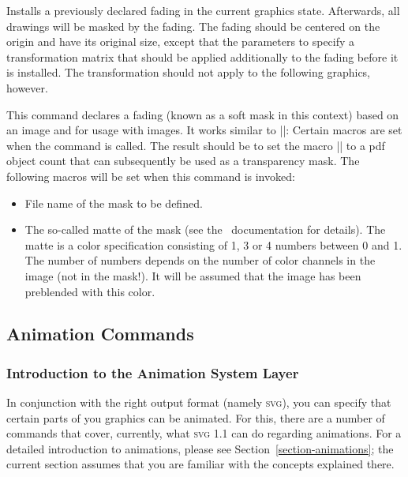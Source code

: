 \begin{command}{\pgfsys@usefading{}}
  Installs a previously declared fading  in the current
  graphics state. Afterwards, all drawings will be masked by the
  fading. The fading should be centered on the origin and have its
  original size, except that the parameters  to 
  specify a transformation matrix that should be applied additionally
  to the fading before it is installed. The transformation should not
  apply to the following graphics, however.
\end{command}


\begin{command}{\pgfsys@definemask}
  This command declares a fading (known as a soft mask in this
  context) based on an image and for usage with images. It
  works similar to |\pgfsys@defineimage|: Certain macros are set when
  the command is called. The result should be to set the macro
  |\pgf@mask| to a pdf object count that can subsequently be used as a
  transparency mask. The following macros will be set when this command is
  invoked:

  \begin{itemize}
  \item \declare{|\pgf@filename|}
    File name of the mask to be defined.

  \item \declare{|\pgf@maskmatte|}
    The so-called matte of the mask (see the \pdf\ documentation for
    details). The matte is a color specification consisting of 1, 3 or
    4 numbers between 0 and 1. The number of numbers depends on the
    number of color channels in the image (not in the mask!). It will
    be assumed that the image has been preblended with this color.
  \end{itemize}
\end{command}


\subsection{Animation Commands}

\subsubsection{Introduction to the Animation System Layer}

In conjunction with the right output format (namely
\textsc{svg}), you can specify that certain parts of you graphics can
be animated. For this, there are a number of commands that
cover, currently, what \textsc{svg 1.1} can do regarding animations.
For a detailed introduction to animations, please see
Section~\ref{section-animations}; the current section assumes that you
are familiar with the concepts explained there.

